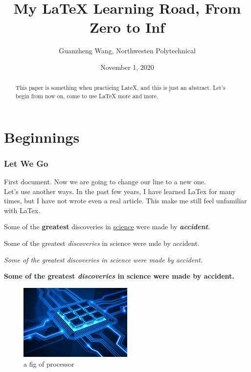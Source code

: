 \documentclass[12pt, letterpaper, twoside]{article}
\title{My \LaTeX{} Learning Road, From Zero to Inf}
\author{Guanzheng Wang, Northwesten Polytechnical }
\date{November 1, 2020}
\begin{document}
\maketitle

\tableofcontents 

\newpage
\begin{abstract}
This paper is something when practicing LateX, and this is just an abstract. Let's begin from now on, come to use LaTeX more and more.
\end{abstract}


\newpage

\part{Beginnings}

\section{Let We Go}


First document. Now we are going to change our line to a new one.\\
Let's use another ways.
\newline
In the past few years, I have learned LaTex for many times, but I have not wrote even a real article. This make me still feel unfamiliar with LaTex.



Some of the \textbf{greatest} discoveries in \underline{science} were made by \textbf{\textit{accident}}.

Some of the greatest \emph{discoveries} in science were mde by accident.

\textit{Some of the greatest \emph{discoveries} in science were made by accident.}

\textbf{Some of the greatest \emph{discoveries} in science were made by accident.}


\begin{figure}[h]
	\centering
	\includegraphics[width=0.5\textwidth]{parallel_computing}
	\caption{a fig of processor}
	\label{fig:processor}
\end{figure}
\end{document}

